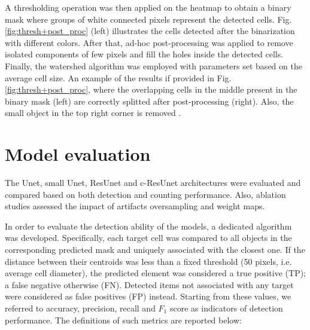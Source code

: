 A thresholding operation was then applied on the heatmap to obtain a binary mask where groups of white connected pixels represent the detected cells. Fig. \ref{fig:thresh+post_proc} (left) illustrates the cells detected after the binarization with different colors.
After that, ad-hoc post-processing was applied to remove isolated components of few pixels and fill the holes inside the detected cells. 
Finally, the watershed algorithm \cite{watershed} was employed with parameters set based on the average cell size.
An example of the results if provided in Fig. \ref{fig:thresh+post_proc}, where the overlapping cells in the middle present in the binary mask (left) are correctly splitted after post-processing (right). Also, the small object in the top right corner is removed
.


\section{Model evaluation} \label{sec:model_evaluation}

The Unet, small Unet, ResUnet and c-ResUnet architectures were evaluated and compared based on both detection and counting performance. 
Also, ablation studies assessed the impact of artifacts oversampling and weight maps.

 In order to evaluate the detection ability of the models, a dedicated algorithm was developed.
Specifically, each target cell was compared to all objects in the corresponding predicted mask and uniquely associated with the closest one.
If the distance between their centroids was less than a fixed threshold (50 pixels, i.e. average cell diameter), the predicted element was considered a true positive (TP); a false negative otherwise (FN).
Detected items not associated with any target were considered as false positives (FP) instead.
Starting from these values, we referred to accuracy, precision, recall and $F_1$ score as indicators of detection performance.
The definitions of such metrics are reported below:

